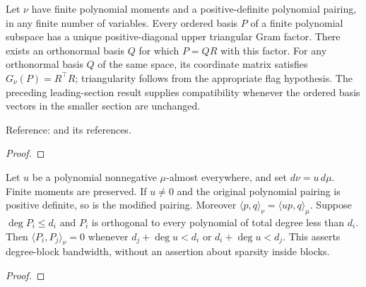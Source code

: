 \begin{theorem}
\label{thm:measure-conversion-cholesky}
\leanok
Let $\nu$ have finite polynomial moments and a positive-definite polynomial
pairing, in any finite number of variables. Every ordered basis $P$ of a finite
polynomial subspace has a unique positive-diagonal upper triangular Gram factor.
There exists an orthonormal basis $Q$ for which $P=QR$ with this factor.
For any orthonormal basis $Q$ of the same space, its coordinate matrix satisfies
$G_\nu(P)=R^\top R$; triangularity follows from the appropriate flag hypothesis.
The preceding leading-section result supplies compatibility whenever the ordered
basis vectors in the smaller section are unchanged.

Reference: \cite[Lemma 2.8]{gutleb-olver-slevinsky} and its references.
\end{theorem}
\begin{proof}
\leanok
\end{proof}

\begin{theorem}
\label{thm:polynomial-density-gram}
\leanok
Let $u$ be a polynomial nonnegative $\mu$-almost everywhere, and set $d\nu=u\,d\mu$.
Finite moments are preserved. If $u\ne0$ and the original polynomial pairing is
positive definite, so is the modified pairing. Moreover
$\langle p,q\rangle_\nu=\langle up,q\rangle_\mu$.
Suppose $\deg P_i\le d_i$ and $P_i$ is orthogonal to every polynomial of total
degree less than $d_i$. Then $\langle P_i,P_j\rangle_\nu=0$ whenever
$d_j+\deg u<d_i$ or $d_i+\deg u<d_j$.
This asserts degree-block bandwidth, without an assertion about sparsity inside blocks.
\end{theorem}
\begin{proof}
\leanok
\end{proof}

